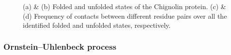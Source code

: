 \documentclass
[
    a4paper,
    DIV=11,
    abstract=true,
    11pt,
]
{scrartcl}
\theoremstyle{definition}
\begin{document}
\begin{figure}
\begin{minipage}[t]{0.4\linewidth}
    \end{minipage}
    \begin{minipage}[t]{0.4\linewidth}
    \end{minipage}
    \caption{(a) \& (b) Folded and unfolded states of the Chignolin protein. (c) \& (d) Frequency of contacts between different residue pairs over all the identified folded and unfolded states, respectively.}
    \label{fig:chig_visuals}
\end{figure}

\subsubsection{Ornstein--Uhlenbeck process}
\end{document}
